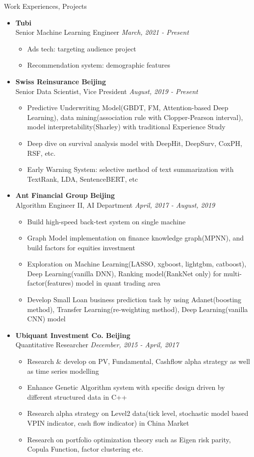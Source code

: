 \documentclass[a4paper,8pt,oneside]{scrartcl}
\newenvironment{ressection}[1]{
    \vspace{2pt}
    {\selectfont#1}
    \begin{itemize}
    \vspace{0pt}
}{
    \end{itemize}
}
\newcommand{\ressubitem}[1]{
    \vspace{0pt}
    \item #1
}
\newcommand{\resbigitem}[3]{
    \vspace{-5pt}
    \item
    \textbf{#1}\\
    #2
    \textit{#3}
}
\newenvironment{ressubsec}[3]{
    \resbigitem{#1}{#2}{#3}
    \vspace{-2pt}
    \begin{itemize}
}{
    \end{itemize}
}
\begin{document}
\begin{ressection}{Work Experiences, Projects}
  \begin{ressubsec}{Tubi}{Senior Machine Learning Engineer}{\hfill March, 2021 - Present}
	  \ressubitem{Ads tech: targeting audience project}
	  \ressubitem{Recommendation system: demographic features}
  \end{ressubsec}
  \begin{ressubsec}{Swiss Reinsurance \hfill Beijing}{Senior Data Scientist, Vice President}{\hfill August, 2019 - Present}
	  \ressubitem{Predictive Underwriting Model(GBDT, FM, Attention-based Deep Learning), data mining(association rule with Clopper-Pearson interval), model interpretability(Sharley) with traditional Experience Study}
	  \ressubitem{Deep dive on survival analysis model with DeepHit, DeepSurv, CoxPH, RSF, etc.}
	  \ressubitem{Early Warning System: selective method of text summarization with TextRank, LDA, SentenceBERT, etc}
  \end{ressubsec}
  \begin{ressubsec}{Ant Financial Group \hfill Beijing}{Algorithm Engineer II, AI Department}{\hfill April, 2017 - August, 2019}
	  \ressubitem{Build high-speed back-test system on single machine}
	  \ressubitem{Graph Model implementation on finance knowledge graph(MPNN), and build factors for equities investment}
	  \ressubitem{Exploration on Machine Learning(LASSO, xgboost, lightgbm, catboost), Deep Learning(vanilla DNN), Ranking model(RankNet only) for multi-factor(features) model in quant trading area}
	  \ressubitem{Develop Small Loan business prediction task by using Adanet(boosting method), Transfer Learning(re-weighting method), Deep Learning(vanilla CNN) model}
  \end{ressubsec}
  \begin{ressubsec}{Ubiquant Investment Co. \hfill Beijing}{Quantitative Researcher}{\hfill December, 2015 - April, 2017}
	  \ressubitem{Research \& develop on PV, Fundamental, Cashflow alpha strategy as well as time series modelling}
	  \ressubitem{Enhance Genetic Algorithm system with specific design driven by different structured data in C++}
	  \ressubitem{Research alpha strategy on Level2 data(tick level, stochastic model based VPIN indicator, cash flow indicator) in China Market}
      \ressubitem{Research on portfolio optimization theory such as Eigen risk parity, Copula Function, factor clustering etc.}
  \end{ressubsec}

\end{ressection}
\end{document}
